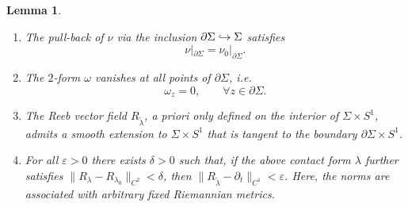 \documentclass[10pt,a4paper]{article}
\providecommand{\ie}{i.e.\ }
\let\epsilon\varepsilon
\newenvironment{enumeratei}
{\bgroup\def\theenumi{\roman{enumi}}\def\theenumii{\arabic{enumii}}\begin{enumerate}}
{\end{enumerate}\egroup}
\newcommand\hto{\mathrel{\lhook\joinrel\to}}
\newtheorem{lem}[thm]{Lemma}
\theoremstyle{definition}
\begin{document}
\begin{lem}\label{l:nearly_Besse_normalized}
\begin{enumeratei}

\item\label{l:nearly_Besse_normalizedi}
The pull-back of $\nu$ via the inclusion $\partial\Sigma\hto\Sigma$ satisfies
\[
\nu|_{\partial\Sigma}=\nu_0|_{\partial\Sigma}.
\]

\item\label{l:nearly_Besse_normalizedii}
The $2$-form $\omega$ vanishes at all points of $\partial\Sigma$, \ie
\[
\omega_z= 0,\qquad \forall z\in \partial\Sigma.
\]

\item\label{l:nearly_Besse_normalizediii}
The Reeb vector field $R_{\tilde\lambda}$, a priori only defined on the interior of $\Sigma\times S^1$, admits a smooth extension to $\Sigma\times S^1$ that is tangent to the boundary $\partial \Sigma\times S^1$.

\item\label{l:nearly_Besse_normalizediv}
For all $\epsilon>0$ there exists $\delta>0$ such that, if the above contact form $\lambda$ further satisfies $\|R_\lambda-R_{\lambda_0}\|_{C^2}<\delta$, then $\|R_{\tilde\lambda}-\partial_t\|_{C^1}<\epsilon$. Here, the norms are associated with arbitrary fixed Riemannian metrics.
\end{enumeratei}
\end{lem}
\end{document}
